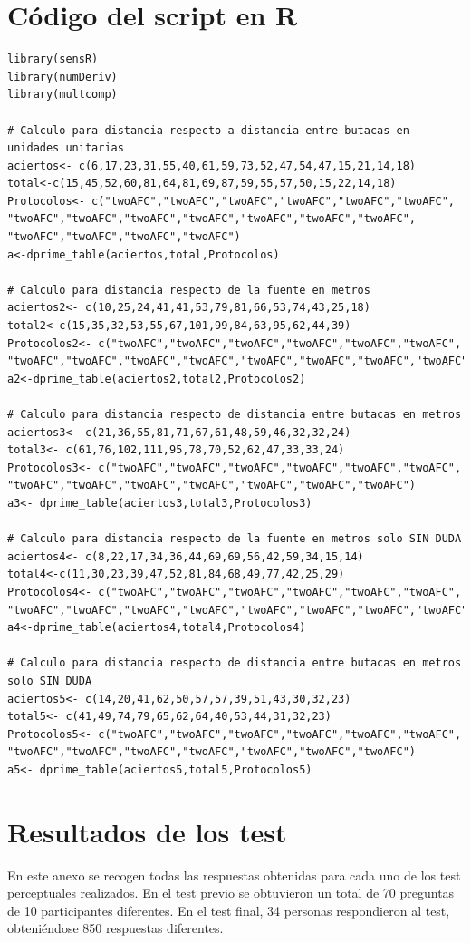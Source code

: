 \documentclass[11pt,a4paper]{book}
\begin{document}
\chapter{Código del script en R}
\begin{verbatim}
library(sensR)
library(numDeriv)
library(multcomp)

# Calculo para distancia respecto a distancia entre butacas en unidades unitarias
aciertos<- c(6,17,23,31,55,40,61,59,73,52,47,54,47,15,21,14,18)
total<-c(15,45,52,60,81,64,81,69,87,59,55,57,50,15,22,14,18)
Protocolos<- c("twoAFC","twoAFC","twoAFC","twoAFC","twoAFC","twoAFC",
"twoAFC","twoAFC","twoAFC","twoAFC","twoAFC","twoAFC","twoAFC",
"twoAFC","twoAFC","twoAFC","twoAFC")
a<-dprime_table(aciertos,total,Protocolos)

# Calculo para distancia respecto de la fuente en metros
aciertos2<- c(10,25,24,41,41,53,79,81,66,53,74,43,25,18)
total2<-c(15,35,32,53,55,67,101,99,84,63,95,62,44,39)
Protocolos2<- c("twoAFC","twoAFC","twoAFC","twoAFC","twoAFC","twoAFC",
"twoAFC","twoAFC","twoAFC","twoAFC","twoAFC","twoAFC","twoAFC","twoAFC")
a2<-dprime_table(aciertos2,total2,Protocolos2)

# Calculo para distancia respecto de distancia entre butacas en metros
aciertos3<- c(21,36,55,81,71,67,61,48,59,46,32,32,24)
total3<- c(61,76,102,111,95,78,70,52,62,47,33,33,24)
Protocolos3<- c("twoAFC","twoAFC","twoAFC","twoAFC","twoAFC","twoAFC",
"twoAFC","twoAFC","twoAFC","twoAFC","twoAFC","twoAFC","twoAFC")
a3<- dprime_table(aciertos3,total3,Protocolos3)

# Calculo para distancia respecto de la fuente en metros solo SIN DUDA
aciertos4<- c(8,22,17,34,36,44,69,69,56,42,59,34,15,14)
total4<-c(11,30,23,39,47,52,81,84,68,49,77,42,25,29)
Protocolos4<- c("twoAFC","twoAFC","twoAFC","twoAFC","twoAFC","twoAFC",
"twoAFC","twoAFC","twoAFC","twoAFC","twoAFC","twoAFC","twoAFC","twoAFC")
a4<-dprime_table(aciertos4,total4,Protocolos4)

# Calculo para distancia respecto de distancia entre butacas en metros solo SIN DUDA
aciertos5<- c(14,20,41,62,50,57,57,39,51,43,30,32,23)
total5<- c(41,49,74,79,65,62,64,40,53,44,31,32,23)
Protocolos5<- c("twoAFC","twoAFC","twoAFC","twoAFC","twoAFC","twoAFC",
"twoAFC","twoAFC","twoAFC","twoAFC","twoAFC","twoAFC","twoAFC")
a5<- dprime_table(aciertos5,total5,Protocolos5)

\end{verbatim}

\chapter{Resultados de los test}
    En este anexo se recogen todas las respuestas obtenidas para cada uno de los test perceptuales realizados. En el test previo se obtuvieron un total de 70 preguntas de 10 participantes diferentes. En el test final, 34 personas respondieron al test, obteniéndose 850 respuestas diferentes.
\end{document}
